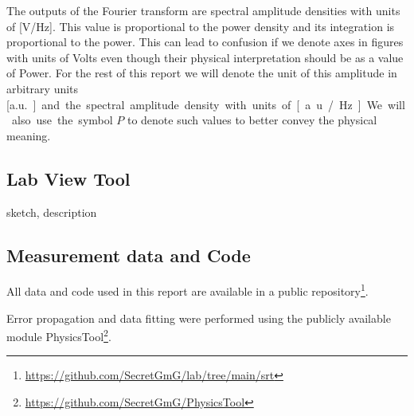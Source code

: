The outputs of the Fourier transform are spectral amplitude densities with units of [\si{\volt/\hertz}]. This value is proportional to the power density and its integration is proportional to the power.
This can lead to confusion if we denote axes in figures with units of Volts even though their physical interpretation should be as a value of Power.
For the rest of this report we will denote the unit of this amplitude in arbitrary units [\si{a.u.}] and the spectral amplitude density with units of [\si{a.u./\hertz}].
We will also use the symbol $P$ to denote such values to better convey the physical meaning.

\subsection{Lab View Tool}
sketch, description


\subsection{Measurement data and Code}
All data and code used in this report are available in a public repository\footnote{\url{https://github.com/SecretGmG/lab/tree/main/srt}}.

Error propagation and data fitting were performed using the publicly available module PhysicsTool\footnote{\url{https://github.com/SecretGmG/PhysicsTool}}.
